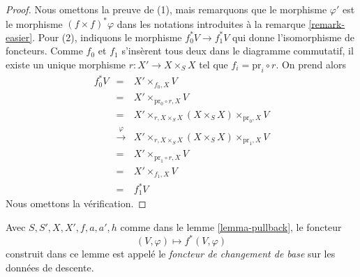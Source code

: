 \begin{proof}
Nous omettons la preuve de (1), mais remarquons que le morphisme $\varphi'$
est le morphisme $(f \times f)^*\varphi$ dans les notations introduites à la
remarque \ref{remark-easier}. Pour (2), indiquons le morphisme
$f_0^*V \to f_1^*V$ qui donne l'isomorphisme de foncteurs. Comme $f_0$ et
$f_1$ s'insèrent tous deux dans le diagramme commutatif, il existe un unique
morphisme $r : X' \to X \times_S X$ tel que
$f_i = \text{pr}_i \circ r$. On prend alors
\begin{eqnarray*}
f_0^*V & = &
X' \times_{f_0, X} V \\
& = &
X' \times_{\text{pr}_0 \circ r, X} V \\
& = &
X' \times_{r, X \times_S X} (X \times_S X) \times_{\text{pr}_0, X} V \\
& \xrightarrow{\varphi} &
X' \times_{r, X \times_S X} (X \times_S X) \times_{\text{pr}_1, X} V \\
& = &
X' \times_{\text{pr}_1 \circ r, X} V \\
& = &
X' \times_{f_1, X} V \\
& = & f_1^*V
\end{eqnarray*}
Nous omettons la vérification.
\end{proof}

\begin{definition}
\label{definition-pullback-functor}
Avec $S, S', X, X', f, a, a', h$ comme dans le
lemme \ref{lemma-pullback}, le foncteur
$$
(V, \varphi) \longmapsto f^*(V, \varphi)
$$
construit dans ce lemme est appelé le {\it foncteur de changement de base}
sur les données de descente.
\end{definition}

